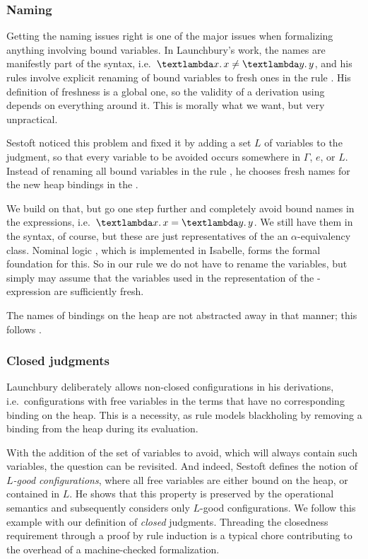 \documentclass{jfp1}
\theoremstyle{nonumberbreak}
\newcommand{\keyword}[1]{\text{\textsf{#1}}}
\newcommand{\sLam}[2]{\text{\textlambda} #1.\, #2}
\newcommand{\sRule}[1]{\text{{\textsc{#1}}}}
\begin{document}
\subsubsection{Naming}
\label{sec_naming}

Getting the naming issues right is one of the major issues when formalizing anything involving bound variables. In Launchbury's work, the names are manifestly part of the syntax, i.e.\ $\sLam x x \ne \sLam y y$, and his rules involve explicit renaming of bound variables to fresh ones in the rule \sRule{Var}. His definition of freshness is a global one, so the validity of a derivation using \sRule{Var} depends on everything around it. This is morally what we want, but very unpractical.

Sestoft  noticed this problem and fixed it by adding a set $L$ of variables to the judgment, so that every variable to be avoided occurs somewhere in $\Gamma$, $e$, or $L$. Instead of renaming all bound variables in the rule \sRule{Var}, he chooses fresh names for the new heap bindings in the \sRule{Let}.

We build on that, but go one step further and completely avoid bound names in the expressions, i.e.\ $\sLam x x = \sLam y y$. We still have them in the syntax, of course, but these are just representatives of the an $\alpha$-equivalency class. Nominal logic \cite{nominal}, which is implemented in Isabelle, forms the formal foundation for this. So in our rule \sRule{Let} we do not have to rename the variables, but simply may assume that the variables used in the representation of the \keyword{let}-expression are sufficiently fresh.

The names of bindings on the heap are not abstracted away in that manner; this follows \cite{nameless}.

\subsubsection{Closed judgments}

Launchbury deliberately allows non-closed configurations in his derivations, i.e.\ configurations with free variables in the terms that have no corresponding binding on the heap. This is a necessity, as rule \sRule{Var} models blackholing by removing a binding from the heap during its evaluation.

With the addition of the set of variables to avoid, which will always contain such variables, the question can be revisited. And indeed, Sestoft defines the notion of \emph{$L$-good configurations}, where all free variables are either bound on the heap, or contained in $L$. He shows that this property is preserved by the operational semantics and subsequently considers only $L$-good configurations. We follow this example with our definition of \emph{closed} judgments. Threading the closedness requirement through a proof by rule induction is a typical chore contributing to the overhead of a machine-checked formalization.
\end{document}
